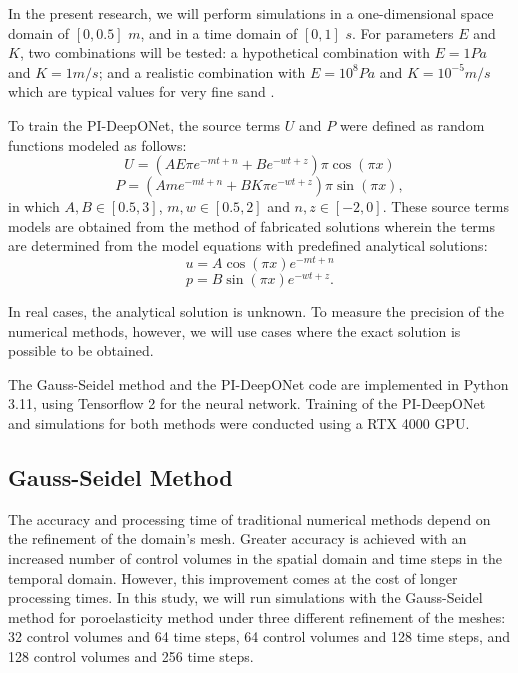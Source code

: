 \documentclass[sn-mathphys]{sn-jnl}%
\theoremstyle{thmstyleone}%
\theoremstyle{thmstyletwo}%
\theoremstyle{thmstylethree}%
\begin{document}
In the present research, we will perform simulations in a one-dimensional space domain of  \(\left[0,0.5\right]\) \(m\), and in a time domain of \(\left[0,1\right]\) \(s\). For parameters \(E\) and \(K\), two combinations will be tested: a hypothetical combination with \(E=1 Pa\) and \(K=1 m/s\); and a realistic combination with \(E=10^8 Pa\) and \(K=10^{-5} m/s\) which are typical values for very fine sand
\cite{jorgensen1980relationships}.

To train the PI-DeepONet, the source terms \(U\) and \(P\) were defined as random functions modeled as follows:
\begin{equation}
U = \left(AE\pi e^{-mt+n} + Be^{-wt+z}\right)\pi\cos{(\pi x)}
\end{equation}
\begin{equation}
P = \left(Ame^{-mt+n} + BK\pi e^{-wt+z}\right)\pi\sin{(\pi x)},
\end{equation}
in which \(A,B\in\left[0.5, 3\right]\), \(m,w\in\left[0.5, 2\right]\) and \(n,z\in\left[-2, 0\right]\). These source terms models are obtained from the method of fabricated solutions \cite{versteeg2007introduction} wherein the terms are determined from the model equations with predefined analytical solutions:
\begin{equation}
u = A\cos{(\pi x)}e^{-mt+n}
\end{equation}
\begin{equation}
p = B\sin{(\pi x)}e^{-wt+z}.
\end{equation}

In real cases, the analytical solution is unknown. To measure the precision of the numerical methods, however, we will use cases where the exact solution is possible to be obtained.

The Gauss-Seidel method and the PI-DeepONet code are implemented in Python 3.11, using Tensorflow 2 for the neural network. Training of the PI-DeepONet and simulations for both methods were conducted using a RTX 4000 GPU.

\subsection{Gauss-Seidel Method}

The accuracy and processing time of traditional numerical methods depend on the refinement of the domain's mesh. Greater accuracy is achieved with an increased number of control volumes in the spatial domain and time steps in the temporal domain. However, this improvement comes at the cost of longer processing times. In this study, we will run simulations with the Gauss-Seidel method for poroelasticity method under three different refinement of the meshes: 32 control volumes and 64 time steps, 64 control volumes and 128 time steps, and 128 control volumes and 256 time steps.
\end{document}

